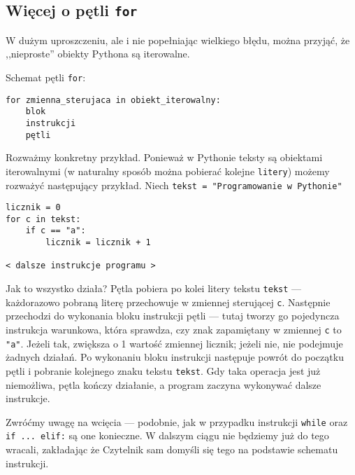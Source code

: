\documentclass[a4paper]{article}
\begin{document}
\subsection{Więcej o pętli \texttt{for}}

W dużym uproszczeniu, ale i nie popełniając wielkiego błędu, można przyjąć, że ,,nieproste'' obiekty Pythona są iterowalne.

Schemat pętli \lstinline|for|:

\lstset{numbers=none}
\begin{lstlisting}
for zmienna_sterujaca in obiekt_iterowalny:
    blok
    instrukcji
    pętli
\end{lstlisting}

Rozważmy konkretny przykład. Ponieważ w Pythonie teksty są obiektami iterowalnymi (w naturalny sposób można pobierać kolejne \texttt{litery}) możemy rozważyć następujący przykład. Niech \lstinline|tekst = "Programowanie w Pythonie"|

\lstset{numbers=none}
\begin{lstlisting}
licznik = 0
for c in tekst:
    if c == "a":
        licznik = licznik + 1

< dalsze instrukcje programu >
\end{lstlisting}

Jak to wszystko działa? Pętla pobiera po kolei litery tekstu \texttt{tekst} --- każdorazowo pobraną literę przechowuje w zmiennej sterującej \texttt{c}. Następnie przechodzi do wykonania bloku instrukcji pętli --- tutaj tworzy go pojedyncza instrukcja warunkowa, która sprawdza, czy znak zapamiętany w zmiennej \texttt{c} to \texttt{"a"}. Jeżeli tak, zwiększa o 1 wartość zmiennej licznik; jeżeli nie, nie podejmuje żadnych działań. Po wykonaniu bloku instrukcji następuje powrót do początku pętli i pobranie kolejnego znaku tekstu \texttt{tekst}. Gdy taka operacja jest już niemożliwa, pętla kończy działanie, a program zaczyna wykonywać dalsze instrukcje.

Zwróćmy uwagę na wcięcia --- podobnie, jak w przypadku instrukcji \lstinline|while| oraz \lstinline|if ... elif:| są one konieczne. W dalszym ciągu nie będziemy już do tego wracali, zakładając że Czytelnik sam domyśli się tego na podstawie schematu instrukcji.
\end{document}
